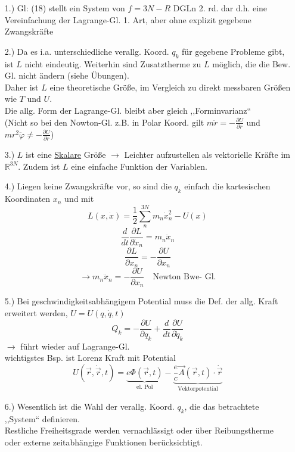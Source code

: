 \documentclass[titlepage,12pt,a4paper,ngerman]{report}
\newcommand{\tx}[1]{\textrm{#1}}
\newcommand{\ub}[1]{\underbrace{#1}}
\begin{document}
{\begin{itemize}
	\item[1.)] Gl: (18) stellt ein System von $ f = 3N - R $ DGLn 2. rd. dar d.h. eine Vereinfachung der Lagrange-Gl. 1. Art, aber ohne explizit gegebene Zwangskräfte
	\item[2.)] Da es i.a. unterschiedliche verallg. Koord. $ q_k $ für gegebene Probleme gibt, ist $ L $ nicht eindeutig. Weiterhin sind Zusatztherme zu $ L $ möglich, die die Bew. Gl. nicht ändern (siehe Übungen).\\
	Daher ist $ L $ eine theoretische Größe, im Vergleich zu direkt messbaren Größen wie $ T $ und $ U $.\\
	Die allg. Form der Lagrange-Gl. bleibt aber gleich ,,Forminvarianz``\\
	(Nicht so bei den Nowton-Gl. z.B. in Polar Koord. gilt $ m\ddot{r} = -\frac{\partial U}{\partial r} $ und $ m r^2 \ddot{\varphi} \neq - \frac{\partial U}{\partial r} $)
	\item[3.)] $ L $ ist eine \underline{Skalare} Größe $ \rightarrow $ Leichter aufzustellen als vektorielle Kräfte im $ \mathbb{R}^{3N} $. Zudem ist $ L $ eine einfache Funktion der Variablen.
	\item[4.)] Liegen keine Zwangskräfte vor, so sind die $ q_k $ einfach die kartesischen Koordinaten $ x_n $ und mit
	$$L(x,\dot{x}) = \frac{1}{2} \sum_n^{3N} m_n \dot{x}^2_n - U(x)$$
	$$\frac{d}{dt} \frac{\partial L}{\partial \dot{x}_n} = m_n \ddot{x}_n$$
	$$\frac{\partial L}{\partial x_n} = - \frac{\partial U}{\partial x_n}$$
	$$ \rightarrow m_n \ddot{x}_n = - \frac{\partial U}{\partial x_n} \quad \tx{Newton Bwe- Gl.}$$
	\item[5.)] Bei geschwindigkeitsabhängigem Potential muss die Def. der allg. Kraft erweitert werden, $ U = U(q,\dot{q},t) $
	$$ Q_k = - \frac{\partial U}{\partial q_k} + \frac{d}{dt} \frac{\partial U}{\partial \dot{q}_k}$$
	$ \rightarrow $ führt wieder auf Lagrange-Gl.\\
	wichtigstes Bsp. ist Lorenz Kraft mit Potential
	$$U(\vec{r}, \dot{\vec{r}}, t) = \ub{e \Phi (\vec{r},t)}_{\tx{el. Pol}} - \ub{\frac{e}{c} \vec{A} (\vec{r},t) \cdot \dot{\vec{r}}}_{\tx{Vektorpotential}}$$
	\item[6.)] Wesentlich ist die Wahl der verallg. Koord. $ q_k $, die das betrachtete ,,System`` definieren.\\
	Restliche Freiheitsgrade werden vernachlässigt oder über Reibungstherme oder externe zeitabhängige Funktionen berücksichtigt.
\end{itemize}
}
\end{document}
